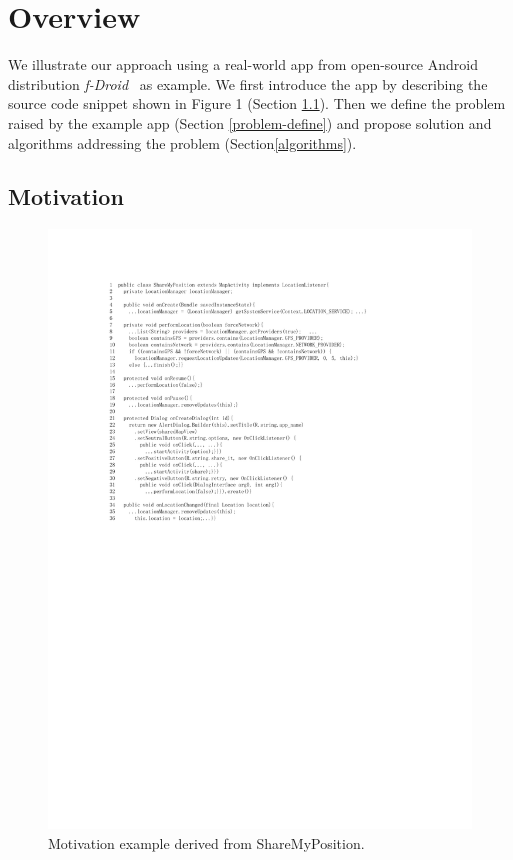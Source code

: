 \section{Overview}\label{overview}
We illustrate our approach using a real-world app from open-source Android distribution \textit{f-Droid}~\cite{newFDroid} as example. We first introduce the app by describing the source code snippet shown in Figure 1 (Section \ref{motivation}). Then we define the problem raised by the example app (Section \ref{problem-define}) and propose solution and algorithms addressing the problem (Section\ref{algorithms}). 
\subsection{Motivation} \label{motivation}

\begin{figure}[htbp]  
  \centering  
  \includegraphics[width=1\linewidth]{pic/motivation1.pdf}  
  \caption{Motivation example derived from ShareMyPosition\cite{newShareMyPosition}.}  
  \label{fig:1}  
\end{figure}


